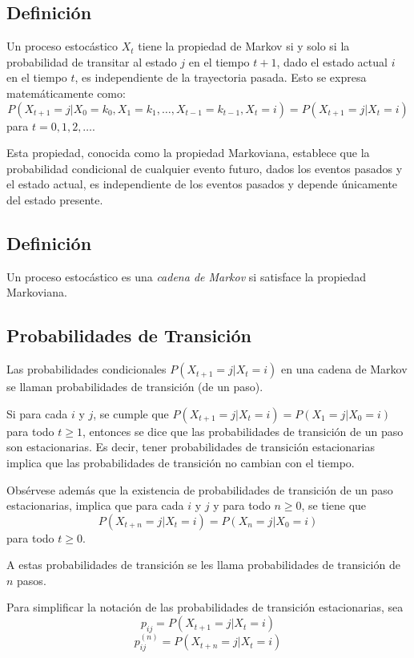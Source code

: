 \documentclass{article}
\begin{document}
\subsection*{Definición}
Un proceso estocástico \( X_t \) tiene la propiedad de Markov si y solo si la probabilidad de transitar al estado \( j \) en el tiempo \( t+1 \), dado el estado actual \( i \) en el tiempo \( t \), es independiente de la trayectoria pasada. Esto se expresa matemáticamente como:
\[ P(X_{t+1} = j | X_0 = k_0, X_1 = k_1, \ldots, X_{t-1} = k_{t-1}, X_t = i) = P(X_{t+1} = j | X_t = i) \]
para \( t = 0, 1, 2, \ldots \).

Esta propiedad, conocida como la propiedad Markoviana, establece que la probabilidad condicional de cualquier evento futuro, dados los eventos pasados y el estado actual, es independiente de los eventos pasados y depende únicamente del estado presente.

\subsection*{Definición}
Un proceso estocástico es una \textit{cadena de Markov} si satisface la propiedad Markoviana.

\subsection{Probabilidades de Transición}

Las probabilidades condicionales \( P(X_{t+1} = j | X_t = i) \) en una cadena de Markov se llaman probabilidades de transición (de un paso).

Si para cada \( i \) y \( j \), se cumple que \( P(X_{t+1} = j | X_t = i) = P(X_1 = j | X_0 = i) \) para todo \( t \geq 1 \), entonces se dice que las probabilidades de transición de un paso son estacionarias. Es decir, tener probabilidades de transición estacionarias implica que las probabilidades de transición no cambian con el tiempo.

Obsérvese además que la existencia de probabilidades de transición de un paso estacionarias, implica que para cada \( i \) y \( j \) y para todo \( n \geq 0 \), se tiene que
\[ P(X_{t+n} = j | X_t = i) = P(X_n = j | X_0 = i) \]
para todo \( t \geq 0 \).

A estas probabilidades de transición se les llama probabilidades de transición de \( n \) pasos.

\vspace{0.25cm}

Para simplificar la notación de las probabilidades de transición estacionarias, sea
\[ p_{ij} = P(X_{t+1} = j | X_t = i) \]
\[ p_{ij}^{(n)} = P(X_{t+n} = j | X_t = i) \]
\end{document}
